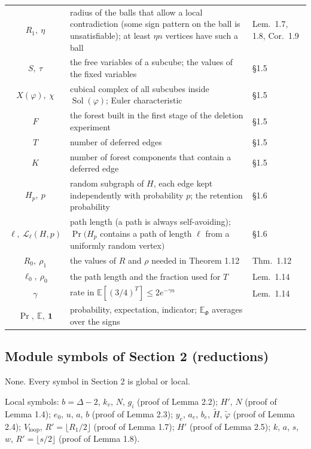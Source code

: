 ﻿\documentclass[10pt,a4paper]{article}
\newcommand{\E}{\mathbb{E}}
\DeclareMathOperator{\Prob}{Pr}
\DeclareMathOperator{\Sol}{Sol}
\newcommand{\Lp}{\mathcal{L}}
\begin{document}
\begin{longtable}{SMW}
\(R_1,\ \eta\) & radius of the balls that allow a local contradiction (some sign pattern on the ball is unsatisfiable); at least \(\eta n\) vertices have such a ball & Lem.~1.7, 1.8, Cor.~1.9 \\
\(S,\ \tau\) & the free variables of a subcube; the values of the fixed variables & \S1.5 \\
\(X(\varphi),\ \chi\) & cubical complex of all subcubes inside \(\Sol(\varphi)\); Euler characteristic & \S1.5 \\
\(F\) & the forest built in the first stage of the deletion experiment & \S1.5 \\
\(T\) & number of deferred edges & \S1.5 \\
\(K\) & number of forest components that contain a deferred edge & \S1.5 \\
\(H_p,\ p\) & random subgraph of \(H\), each edge kept independently with probability \(p\); the retention probability & \S1.6 \\
\(\ell,\ \Lp_\ell(H,p)\) & path length (a path is always self-avoiding); \(\Prob(H_p\) contains a path of length \(\ell\) from a uniformly random vertex\()\) & \S1.6 \\
\(R_0,\ \rho_1\) & the values of \(R\) and \(\rho\) needed in Theorem 1.12 & Thm.~1.12 \\
\(\ell_0,\ \rho_0\) & the path length and the fraction used for \(T\) & Lem.~1.14 \\
\(\gamma\) & rate in \(\E[(3/4)^T]\le2e^{-\gamma n}\) & Lem.~1.14 \\
\(\Prob,\ \E,\ \mathbf 1\) & probability, expectation, indicator; \(\E_\Phi\) averages over the signs & \\
\bottomrule
\end{longtable}

\subsection{Module symbols of Section 2 (reductions)}

None. Every symbol in Section 2 is global or local.

Local symbols: \(b=\Delta-2\), \(k_v\), \(N\), \(g_i\) (proof of Lemma 2.2);
\(H'\), \(N\) (proof of Lemma 1.4); \(e_0\), \(u\), \(a\), \(b\) (proof of
Lemma 2.3); \(y_e\), \(a_e\), \(b_e\), \(\widetilde H\), \(\widetilde\varphi\)
(proof of Lemma 2.4); \(V_{\mathrm{loop}}\), \(R'=\lfloor R_1/2\rfloor\) (proof
of Lemma 1.7); \(H'\) (proof of Lemma 2.5); \(k\), \(a\), \(s\), \(w\),
\(R'=\lfloor s/2\rfloor\) (proof of Lemma 1.8).
\end{document}
